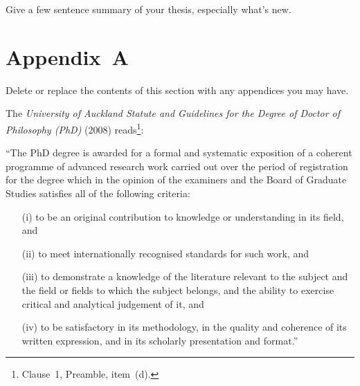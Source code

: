 \documentclass[12pt,a4paper]{article}
\begin{document}
Give a few sentence summary of your thesis, especially
what's new.















\section*{Appendix~A}

Delete or replace the contents of this section with any
appendices you may have.

\bigskip

\bigskip

The \textit{University of Auckland Statute and Guidelines for the
Degree of Doctor of Philosophy (PhD)} (2008)
reads\footnote{Clause~1, Preamble, item~(d).}:

\bigskip


\noindent
``The PhD degree is awarded for a formal and systematic
exposition of a coherent programme of advanced research
work carried out over the period of registration for the
degree which in the opinion of the examiners and the Board
of Graduate Studies satisfies all of the following criteria:

\begin{itemize}

\item[(i)] to be an original contribution to knowledge or
understanding in its field, and

\item[(ii)] to meet internationally recognised standards
for such work, and

\item[(iii)] to demonstrate a knowledge of the literature
relevant to the subject and the field or fields to which
the subject belongs, and the ability to exercise critical
and analytical judgement of it, and

\item[(iv)] to be satisfactory in its methodology, in the
quality and coherence of its written expression, and in
its scholarly presentation and format.''

\end{itemize}






\end{document}
